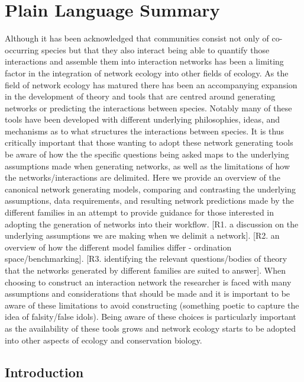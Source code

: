 \documentclass[
]{agujournal2019}
\begin{document}
\section*{Plain Language Summary}
Although it has been acknowledged that communities consist not only of
co-occurring species but that they also interact being able to quantify
those interactions and assemble them into interaction networks has been
a limiting factor in the integration of network ecology into other
fields of ecology. As the field of network ecology has matured there has
been an accompanying expansion in the development of theory and tools
that are centred around generating networks or predicting the
interactions between species. Notably many of these tools have been
developed with different underlying philosophies, ideas, and mechanisms
as to what structures the interactions between species. It is thus
critically important that those wanting to adopt these network
generating tools be aware of how the the specific questions being asked
maps to the underlying assumptions made when generating networks, as
well as the limitations of how the networks/interactions are delimited.
Here we provide an overview of the canonical network generating models,
comparing and contrasting the underlying assumptions, data requirements,
and resulting network predictions made by the different families in an
attempt to provide guidance for those interested in adopting the
generation of networks into their workflow. {[}R1. a discussion on the
underlying assumptions we are making when we delimit a network{]}.
{[}R2. an overview of how the different model families differ -
ordination space/benchmarking{]}. {[}R3. identifying the relevant
questions/bodies of theory that the networks generated by different
families are suited to answer{]}. When choosing to construct an
interaction network the researcher is faced with many assumptions and
considerations that should be made and it is important to be aware of
these limitations to avoid constructing (something poetic to capture the
idea of falsity/false idols). Being aware of these choices is
particularly important as the availability of these tools grows and
network ecology starts to be adopted into other aspects of ecology and
conservation biology.



\subsection{Introduction}\label{introduction}
\end{document}
